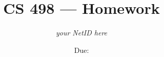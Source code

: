 \documentclass{article}
\title{CS 498 --- Homework \hwno}
\author{\emph{your NetID here}}
\date{Due: \duedate }
\begin{document}
\maketitle


\begin{enumerate}

  

  
  
\end{enumerate}
\end{document}
